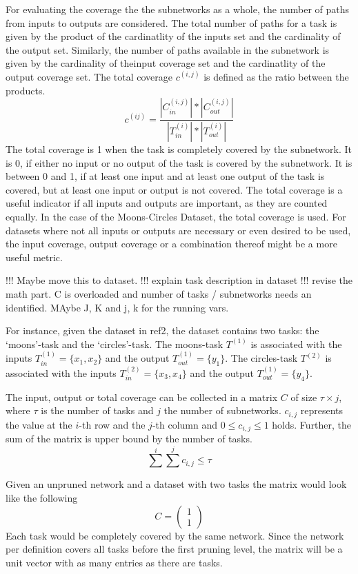 For evaluating the coverage the the subnetworks as a whole, the number of paths from inputs to outputs are considered.
The total number of paths for a task is given by the product of the cardinatlity of the inputs set and the cardinality of the output set.
Similarly, the number of paths available in the subnetwork is given by the cardinality of theinput coverage set and the cardinatlity of the output coverage set.
The total coverage $c^{(i,j)}$ is defined as the ratio between the products.
\[
c^{(ij)} = \frac{
    | C^{(i,j)}_{in}| * | C^{(i,j)}_{out} |
    }{
    |T^{(i)}_{in}| * |T^{(i)}_{out}|
}
\]
The total coverage is 1 when the task is completely covered by the subnetwork.
It is 0, if either no input or no output of the task is covered by the subnetwork.
It is between 0 and 1, if at least one input and at least one output of the task is covered, but at least one input or output is not covered.
The total coverage is a useful indicator if all inputs and outputs are important, as they are counted equally.
In the case of the Moons-Circles Dataset, the total coverage is used.
For datasets where not all inputs or outputs are necessary or even desired to be used, the input coverage, output coverage or a combination thereof might be a more useful metric.

!!! Maybe move this to dataset.
!!! explain task description in dataset
!!! revise the math part. C is overloaded and number of tasks / subnetworks needs an identified. MAybe J, K and j, k for the running vars.

For instance, given the dataset in ref2, the dataset contains two tasks: the `moons'-task and the `circles'-task. 
The moons-task $T^{(1)}$ is associated with the inputs $T^{(1)}_{in} = \{x_1,x_2\}$ and the output $T^{(1)}_{out} = \{y_1\}$.
The circles-task $T^{(2)}$ is associated with the inputs $T^{(2)}_{in} = \{x_3,x_4\}$ and the output $T^{(1)}_{out} = \{y_4\}$.

The input, output or total coverage can be collected in a matrix $C$ of size $\tau \times j$, where $\tau$ is the number of tasks and $j$ the number of subnetworks. 
$c_{i,j}$ represents the value at the $i$-th row and the $j$-th column and $0 \leq c_{i,j} \leq 1$ holds.
Further, the sum of the matrix is upper bound by the number of tasks.
\[
\sum^{i} \sum^{j} c_{i,j} \leq \tau
\]


Given an unpruned network and a dataset with two tasks the matrix would look like the following 
\[
C = \begin{pmatrix}
    1 \\ 1
\end{pmatrix}
\]
Each task would be completely covered by the same network.
Since the network per definition covers all tasks before the first pruning level, the matrix will be a unit vector with as many entries as there are tasks.

